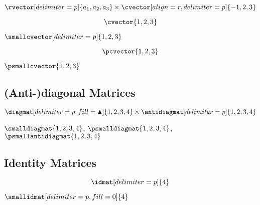 \documentclass[parskip=half]{scrartcl}
\begin{document}
\begin{Example}[gobble=2]
  \[
    \rvector[delimiter=p]{a_{1},a_{2},a_{3}}
    \times \cvector[align=r,delimiter=p]{-1,2,3}
  \]
\end{Example}

\fulllinerule

\begin{SideBySideExample}[xrightmargin=.5\textwidth,gobble=2]
  \[
    \cvector{1,2,3}
  \]
\end{SideBySideExample}

\fulllinerule

\begin{SideBySideExample}[xrightmargin=.45\textwidth]
\(\smallcvector[delimiter=p]{1,2,3}\)
\end{SideBySideExample}

\fulllinerule

\begin{SideBySideExample}[gobble=2,xrightmargin=.5\textwidth]
  \[
    \pcvector{1,2,3}
  \]

  \(\psmallcvector{1,2,3}\)
\end{SideBySideExample}

\fulllinerule

\subsection{(Anti-)diagonal Matrices}
\begin{Example}[gobble=2]
  \[
    \diagmat[delimiter=p,fill=\blacktriangle]{1,2,3,4} \times
    \antidiagmat[delimiter=p]{1,2,3,4}
  \]
\end{Example}

\fulllinerule

\begin{Example}[gobble=2]
  \(\smalldiagmat{1,2,3,4}\),
  \(\psmalldiagmat{1,2,3,4}\),
  \(\psmallantidiagmat{1,2,3,4}\)
\end{Example}

\nopagebreak\fulllinerule

\subsection{Identity Matrices}
\begin{SideBySideExample}[xrightmargin=.45\textwidth,gobble=2]
  \[
    \idmat[delimiter=p]{4}
  \]

  \(\smallidmat[delimiter=p,fill=0]{4}\)
\end{SideBySideExample}
\end{document}
